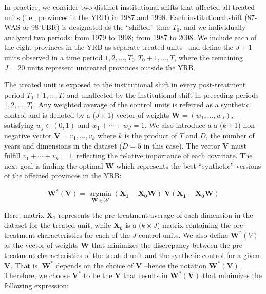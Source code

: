 In practice, we consider two distinct institutional shifts that affected all treated units (i.e., provinces in the YRB) in 1987 and 1998.
Each institutional shift (87-WAS or 98-UBR) is designated as the ``shifted'' time $T_0$, and we individually analyzed two periods: from 1979 to 1998; from 1987 to 2008.
We include each of the eight provinces in the YRB as separate treated units~\cite{abadie2021} and define the $J+1$ units observed in a time period $1, 2, \dots, T_0, T_0 + 1, \dots, T$, where the remaining $J=20$ units represent untreated provinces outside the YRB.\

The treated unit is exposed to the institutional shift in every post-treatment period $T_0 +1, \dots, T$, and unaffected by the institutional shift in preceding periods $1, 2, \dots, T_0$.
Any weighted average of the control units is referred as a synthetic control and is denoted by a ($J \times 1$) vector of weights $\mathbf{W} = (w_{1}, \ldots ,w_{J})$, satisfying $w_j \in (0, 1)$ and $w_1 + \cdots  + w_{J} = 1$.
We also introduce a a ($k \times 1$) non-negative vector $\mathbf{V} = v_{1}, \ldots ,v_{k}$ where $k$ is the product of $T$ and $D$, the number of years and dimensions in the dataset ($D = 5$ in this case).
The vector $\mathbf{V}$ must fulfill $v_1 + \cdots  + v_{k} = 1$, reflecting the relative importance of each covariate.
The next goal is finding the optimal $\mathbf{W}$ which represents the best ``synthetic'' versions of the affected provinces in the YRB:\

\begin{equation}
    \mathbf{W^{*}(V)}=\underset{\mathbf{W} \in \mathcal{W}}{\operatorname{argmin}}\left(\mathbf{X}_{\mathbf{1}}-\mathbf{X}_{\mathbf{0}} \mathbf{W}\right)^{\prime} \mathbf{V}\left(\mathbf{X}_{\mathbf{1}}-\mathbf{X}_{\mathbf{0}} \mathbf{W}\right)
\end{equation}

Here, matrix $\mathbf{X_1}$ represents the pre-treatment average of each dimension in the dataset for the treated unit, while $\mathbf{X_0}$ is a ($k \times J$) matrix containing the pre-treatment characteristics for each of the $J$ control units.
We also define $\mathbf{W}^{*}(V)$ as the vector of weights $\mathbf{W}$ that minimizes the discrepancy between the pre-treatment characteristics of the treated unit and the synthetic control for a given $\mathbf{V}$.
That is, $\mathbf{W^{*}}$ depends on the choice of $\mathbf{V}$ –hence the notation $\mathbf{W^{*}(V)}$. Therefore, we choose $\mathbf{V^{*}}$ to be the $\mathbf{V}$ that results in $\mathbf{{W}^{*}(V)}$ that minimizes the following expression:

